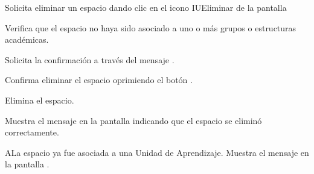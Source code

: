 \begin{UCtrayectoria}
	\UCpaso [\UCactor] Solicita eliminar un espacio dando clic en el icono IUEliminar 
	de la pantalla 
	
	\UCpaso [\UCsist] Verifica que el espacio no haya sido asociado a uno o más grupos o estructuras académicas. 
	
	\UCpaso [\UCsist] Solicita la confirmación a través del mensaje .
	
	\UCpaso [\UCactor] Confirma eliminar el espacio oprimiendo el botón .
	
	\UCpaso [\UCsist] Elimina el espacio.
	
	\UCpaso [\UCsist] Muestra el mensaje  en la pantalla  indicando que el espacio se eliminó correctamente.	
	
\end{UCtrayectoria}

\begin{UCtrayectoriaA}{A}{La espacio ya fue asociada a una Unidad de Aprendizaje.}
	\UCpaso [\UCsist] Muestra el mensaje  en la pantalla . 
\end{UCtrayectoriaA}
